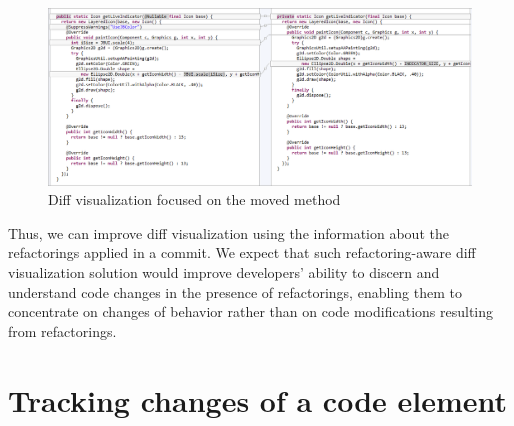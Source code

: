 \begin{figure}[htbp]
\centering
\includegraphics[width=\linewidth]{img/c2.png}
\caption{Diff visualization focused on the moved method}
\label{FigRwDiff2}
\end{figure}

Thus, we can improve diff visualization using the information about the refactorings applied in a commit.
We expect that such refactoring-aware diff visualization solution would improve developers' ability to discern and understand code changes in the presence of refactorings, enabling them to concentrate on changes of behavior rather than on code modifications resulting from refactorings.


\section{Tracking changes of a code element}
\label{SecAppTrackChanges}

